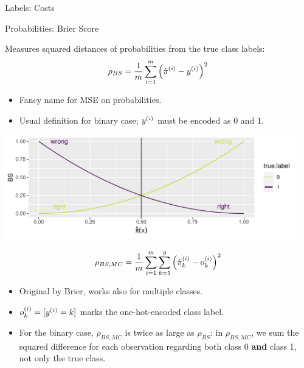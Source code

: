 \documentclass[11pt,compress,t,notes=noshow, xcolor=table]{beamer}
\begin{document}
\begin{vbframe}{Labels: Costs}
\begin{itemize}
  
  \end{itemize}
 
 
\end{vbframe}


\begin{vbframe}{Probabilities: Brier Score}

Measures squared distances of probabilities from the true class labels:
$$\rho_{BS} = \frac{1}{m} \sum_{i = 1}^m 
\left( \hat \pi^{(i)} - y^{(i)} \right)^2$$

\begin{itemize}
  \item Fancy name for MSE on probabilities.
  \item Usual definition for binary case; $y^{(i)}$ must be encoded as 0 and 1.
\end{itemize}

\lz

\begin{knitrout}\scriptsize
{}\color{fgcolor}

{\centering \includegraphics[width=0.95\textwidth]{figure/eval_mclass_1} 

}

\end{knitrout}


\framebreak

$$\rho_{BS, MC} = \frac{1}{m} \sum_{i = 1}^m \sum\limits_{k=1}^g
\left( \hat \pi_k^{(i)} - o_k^{(i)} \right)^2$$
\begin{itemize}
  \item Original by Brier, works also for multiple classes.
  \item $ o_k^{(i)} = [ y^{(i)} = k ] $ marks the one-hot-encoded class label.
  \item For the binary case, $\rho_{BS, MC}$ is twice as large 
  as $\rho_{BS}$: in $\rho_{BS, MC}$, we sum 
  the squared difference for each observation regarding both class 0 
  \textbf{and} class 1, not only the true class.
\end{itemize}

\end{vbframe}
\end{document}
